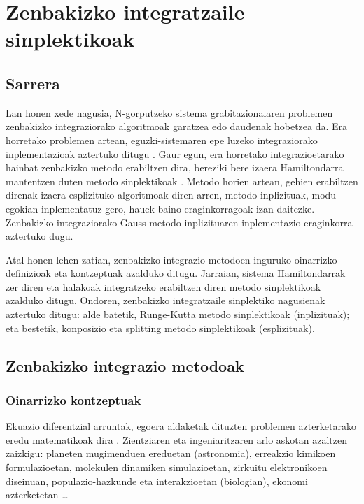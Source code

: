\chapter{Zenbakizko integratzaile sinplektikoak}

\section{Sarrera}

Lan honen xede nagusia, N-gorputzeko sistema grabitazionalaren problemen zenbakizko integraziorako algoritmoak garatzea edo daudenak hobetzea da. Era horretako problemen artean, eguzki-sistemaren epe luzeko integraziorako inplementazioak aztertuko ditugu \cite{Kholshevnikov2007,Brumberg2013} . Gaur egun, era horretako integrazioetarako hainbat zenbakizko metodo erabiltzen dira, bereziki bere izaera Hamiltondarra mantentzen duten metodo sinplektikoak \cite{Eggl2010,Saha1992,Farres2013}. Metodo horien artean, gehien erabiltzen direnak izaera esplizituko algoritmoak diren arren, metodo inplizituak, modu egokian inplementatuz gero, hauek baino eraginkorragoak izan daitezke. Zenbakizko integraziorako Gauss metodo inplizituaren inplementazio eraginkorra aztertuko dugu.   

Atal honen lehen zatian, zenbakizko integrazio-metodoen inguruko oinarrizko definizioak eta kontzeptuak azalduko ditugu. 
Jarraian, sistema Hamiltondarrak zer diren eta halakoak integratzeko erabiltzen diren metodo sinplektikoak azalduko ditugu. Ondoren, zenbakizko integratzaile sinplektiko nagusienak aztertuko ditugu: alde batetik, Runge-Kutta metodo sinplektikoak (inplizituak); eta bestetik, konposizio eta splitting metodo sinplektikoak (esplizituak).

\section{Zenbakizko integrazio metodoak}

\subsection{Oinarrizko kontzeptuak}

Ekuazio diferentzial arruntak, egoera aldaketak dituzten problemen azterketarako eredu matematikoak dira \cite{Hairer2015}. Zientziaren eta ingeniaritzaren arlo askotan azaltzen zaizkigu: planeten mugimenduen ereduetan (astronomia), erreakzio kimikoen formulazioetan, molekulen dinamiken simulazioetan, zirkuitu elektronikoen diseinuan, populazio-hazkunde eta interakzioetan (biologian), ekonomi azterketetan \ldots  

